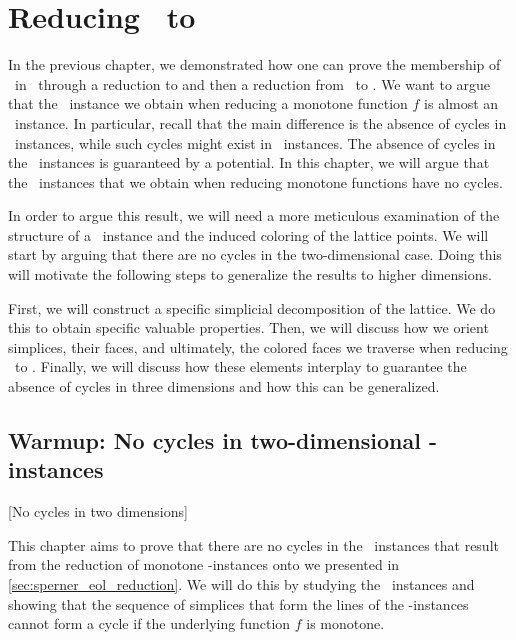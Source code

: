 \setchapterpreamble[u]{\margintoc}
\chapter{Reducing \Tarski\ to \EOPL}

In the previous chapter, we demonstrated how one can prove the membership of \Tarski\ in \PPAD\ through a reduction to \Sperner and then a reduction from \Sperner\ to \EndOfLine. We want to argue that the \EndOfLine\ instance we obtain when reducing a monotone function $f$ is almost an \EndOfPotentialLine\ instance. In particular, recall that the main difference is the absence of cycles in \EndOfPotentialLine\ instances, while such cycles might exist in \EndOfLine\ instances. The absence of cycles in the \EndOfPotentialLine\ instances is guaranteed by a potential. In this chapter, we will argue that the \EndOfLine\ instances that we obtain when reducing monotone functions have no cycles.

In order to argue this result, we will need a more meticulous examination of the structure of a \Tarski\ instance and the induced coloring of the lattice points. We will start by arguing that there are no cycles in the two-dimensional case. Doing this will motivate the following steps to generalize the results to higher dimensions.

First, we will construct a specific simplicial decomposition of the lattice. We do this to obtain specific valuable properties. Then, we will discuss how we orient simplices, their faces, and ultimately, the colored faces we traverse when reducing \Sperner\ to \EndOfLine. Finally, we will discuss how these elements interplay to guarantee the absence of cycles in three dimensions and how this can be generalized.

\section{Warmup: No cycles in two-dimensional \Tarskistar-instances}[No cycles in two dimensions]

This chapter aims to prove that there are no cycles in the \EndOfLine\ instances that result from the reduction of monotone \Tarskistar-instances onto \EndOfLine we presented in \cref{sec:sperner_eol_reduction}. We will do this by studying the \Sperner\ instances and showing that the sequence of simplices that form the lines of the \EndOfLine-instances cannot form a cycle if the underlying function $f$ is monotone.

